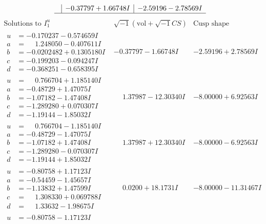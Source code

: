 \documentclass[1p]{elsarticle_modified}
\theoremstyle{definition}
\newcommand{\I}{\sqrt{-1}}
\begin{document}
$$\begin{array}{c|c|c}
 & -0.37797 + 1.66748 I & -2.59196 - 2.78569 I\\
 \hline 
 \end{array}$$\newpage$$\begin{array}{c|c|c}  
\text{Solutions to }I^u_{1}& \I (\text{vol} + \sqrt{-1}CS) & \text{Cusp shape}\\
 \hline 
\begin{aligned}
u &= -0.170237 - 0.574659 I \\
a &= \phantom{-}1.248050 - 0.407611 I \\
b &= -0.0202482 + 0.1305180 I \\
c &= -0.199203 - 0.094247 I \\
d &= -0.368251 - 0.658395 I\end{aligned}
 & -0.37797 - 1.66748 I & -2.59196 + 2.78569 I \\ \hline\begin{aligned}
u &= \phantom{-}0.766704 + 1.185140 I \\
a &= -0.48729 + 1.47075 I \\
b &= -1.07182 - 1.47408 I \\
c &= -1.289280 + 0.070307 I \\
d &= -1.19144 - 1.85032 I\end{aligned}
 & \phantom{-}1.37987 - 12.30340 I & -8.00000 + 6.92563 I \\ \hline\begin{aligned}
u &= \phantom{-}0.766704 - 1.185140 I \\
a &= -0.48729 - 1.47075 I \\
b &= -1.07182 + 1.47408 I \\
c &= -1.289280 - 0.070307 I \\
d &= -1.19144 + 1.85032 I\end{aligned}
 & \phantom{-}1.37987 + 12.30340 I & -8.00000 - 6.92563 I \\ \hline\begin{aligned}
u &= -0.80758 + 1.17123 I \\
a &= -0.54459 - 1.45657 I \\
b &= -1.13832 + 1.47599 I \\
c &= \phantom{-}1.308330 + 0.069788 I \\
d &= \phantom{-}1.33632 - 1.98675 I\end{aligned}
 & \phantom{-}0.0200 + 18.1731 I & -8.00000 - 11.31467 I \\ \hline\begin{aligned}
u &= -0.80758 - 1.17123 I \\

\end{aligned}
\end{array}$$
\end{document}
